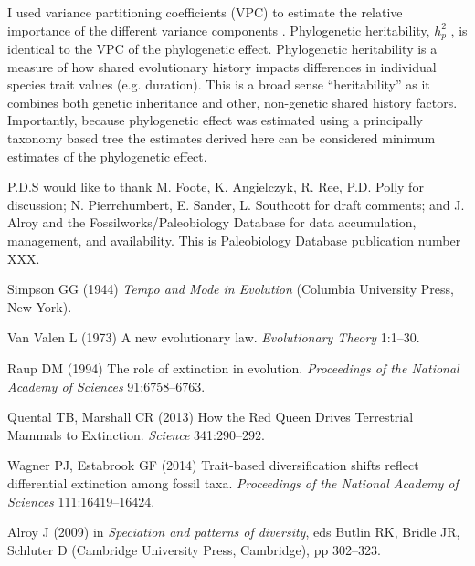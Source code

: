 \documentclass{pnastwo}
\begin{document}
\begin{article}
\begin{materials}
I used variance partitioning coefficients (VPC) to estimate the relative importance of the different variance components \cite{Gelman2007}. Phylogenetic heritability, \(h_{p}^{2}\) \cite{Lynch1991,Housworth2004}, is identical to the VPC of the phylogenetic effect. Phylogenetic heritability is a measure of how shared evolutionary history impacts differences in individual species trait values (e.g. duration). This is a broad sense ``heritability'' as it combines both genetic inheritance and other, non-genetic shared history factors. Importantly, because phylogenetic effect was estimated using a principally taxonomy based tree the estimates derived here can be considered minimum estimates of the phylogenetic effect.
\end{materials}

\begin{acknowledgments}
P.D.S would like to thank M. Foote, K. Angielczyk, R. Ree, P.D. Polly for discussion; N. Pierrehumbert, E. Sander, L. Southcott for draft comments; and J. Alroy and the Fossilworks/Paleobiology Database for data accumulation, management, and availability. This is Paleobiology Database publication number XXX.
\end{acknowledgments}



\begin{thebibliography}{10}

Simpson GG
\newblock (1944) \emph{{Tempo and Mode in Evolution}}
\newblock (Columbia University Press, New York).

{Van Valen} L
\newblock (1973) {A new evolutionary law}.
\newblock \emph{Evolutionary Theory} 1:1--30.

Raup DM
\newblock (1994) {The role of extinction in evolution}.
\newblock \emph{Proceedings of the National Academy of Sciences} 91:6758--6763.

Quental TB, Marshall CR
\newblock (2013) {How the Red Queen Drives Terrestrial Mammals to Extinction}.
\newblock \emph{Science} 341:290--292.

Wagner PJ, Estabrook GF
\newblock (2014) {Trait-based diversification shifts reflect differential
  extinction among fossil taxa}.
\newblock \emph{Proceedings of the National Academy of Sciences}
  111:16419--16424.

Alroy J
\newblock (2009) in \emph{Speciation and patterns of diversity}, eds{} Butlin
  RK, Bridle JR, Schluter D
\newblock (Cambridge University Press, Cambridge), pp 302--323.


\end{thebibliography}
\end{article}
\end{document}
